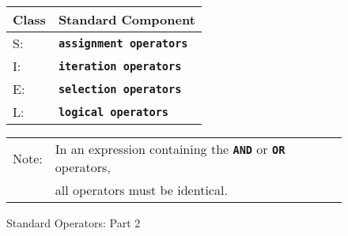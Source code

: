 \documentclass[12pt]{article}
\newcommand{\TT}[1]{{\tt \bfseries #1}}
\begin{document}
\begin{figure*}[!p]
\begin{center}
\medskip

\begin{tabular}{ll}
Class & Standard Component
\\\hline
S: & \TT{assignment operators} \\
I: & \TT{iteration operators} \\
E: & \TT{selection operators} \\
L: & \TT{logical operators} \\
\end{tabular}

\medskip

\begin{tabular}{ll}
Note: & In an expression containing the \TT{AND} or \TT{OR} operators, \\
      & all operators must be identical. \\
\end{tabular}

\end{center}
\caption{Standard Operators: Part 2}
\label{STANDARD-OPERATORS-2}
\end{figure*}
\end{document}
